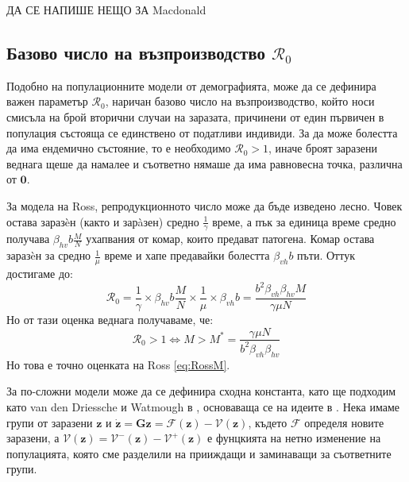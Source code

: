 \color{Red} ДА СЕ НАПИШЕ НЕЩО ЗА Macdonald
\color{Black}

\subsection{Базово число на възпроизводство $\mathscr{R}_0$}
Подобно на популационните модели от демографията, може да се дефинира важен параметър $\mathscr{R}_0$, наричан базово число на възпроизводство, който носи смисъла на брой вторични случаи на заразата, причинени от един първичен в популация състояща се единствено от податливи индивиди.
За да може болестта да има ендемично състояние, то е необходимо $\mathscr{R}_0 > 1$, иначе броят заразени веднага щеше да намалее и съответно нямаше да има равновесна точка, различна от $\mathbf{0}$.

За модела на Ross, репродукционното число може да бъде изведено лесно.
Човек остава заразèн (както и зарàзен) средно $\frac{1}{\gamma}$ време, а пък за единица време средно получава $\beta_{hv} b \frac{M}{N}$ ухапвания от комар, които предават патогена.
Комар остава заразèн за средно $\frac{1}{\mu}$ време и хапе предавайки болестта $\beta_{vh} b$ пъти.
Оттук достигаме до:
\begin{equation}
  \mathscr{R}_0 = \frac{1}{\gamma} \times \beta_{hv} b \frac{M}{N} \times \frac{1}{\mu} \times \beta_{vh} b = \frac{b^2 \beta_{vh} \beta_{hv} M}{\gamma \mu N}
\end{equation}
Но от тази оценка веднага получаваме, че:
\begin{equation}
  \mathscr{R}_0 > 1 \iff M > M^* = \frac{\gamma \mu N}{b^2 \beta_{vh} \beta_{hv}}
\end{equation}
Но това е точно оценката на Ross \eqref{eq:RossM}.

За по-сложни модели може да се дефинира сходна константа, като ще подходим като van den Driessche и Watmough в \cite{Driessche2002}, основаваща се на идеите в \cite{Diekmann1990}. Нека имаме групи от заразени $\mathbf{z}$ и $\dot{\mathbf{z}} = \mathbf{G}{\mathbf{z}} = \mathscr{F}(\mathbf{z}) - \mathscr{V}(\mathbf{z})$, където $\mathscr{F}$ определя новите заразени, а $\mathscr{V}(\mathbf{z}) = \mathscr{V}^-(\mathbf{z}) - \mathscr{V}^+(\mathbf{z})$ е фунцкията на нетно изменение на популацията, която сме разделили на прииждащи и заминаващи за съответните групи.


